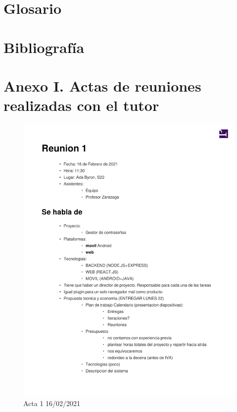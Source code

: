\documentclass{article}
\begin{document}
\pagebreak

\section*{Glosario}

\section*{Bibliografía}
 
\section*{Anexo I. Actas de reuniones realizadas con el tutor}
\begin{figure}[H]
   \includegraphics[width=.8\textwidth]{../../actas_reuniones/2021.02.16_1_Actas.pdf}
   \caption{Acta 1 16/02/2021}
\end{figure}
\end{document}
